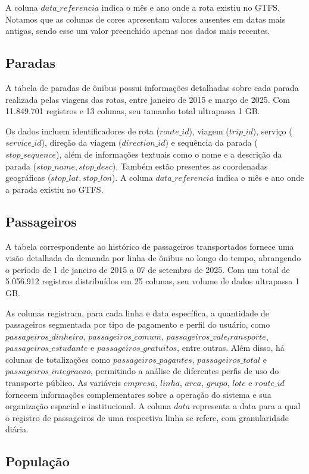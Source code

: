 A coluna $data\_referencia$ indica o mês e ano onde a rota existiu no GTFS. Notamos que as colunas de cores apresentam valores ausentes em datas mais antigas, sendo esse um valor preenchido apenas nos dados mais recentes.

\subsection{Paradas}
A tabela de paradas de ônibus possui informações detalhadas sobre cada parada realizada pelas viagens das rotas, entre janeiro de 2015 e março de 2025. Com 11.849.701 registros e 13 colunas, seu tamanho total ultrapassa 1 GB.

Os dados incluem identificadores de rota ($route\_id$), viagem ($trip\_id$), serviço ($service\_id$), direção da viagem ($direction\_id$) e sequência da parada ($stop\_sequence$), além de informações textuais como o nome e a descrição da parada ($stop\_name, stop\_desc$). Também estão presentes as coordenadas geográficas ($stop\_lat, stop\_lon$). A coluna $data\_referencia$ indica o mês e ano onde a parada existiu no GTFS.

\subsection{Passageiros}

A tabela correspondente ao histórico de passageiros transportados fornece uma visão detalhada da demanda por linha de ônibus ao longo do tempo, abrangendo o período de 1 de janeiro de 2015 a 07 de setembro de 2025. Com um total de 5.056.912 registros distribuídos em 25 colunas, seu volume de dados ultrapassa 1 GB.

As colunas registram, para cada linha e data específica, a quantidade de passageiros segmentada por tipo de pagamento e perfil do usuário, como $passageiros\_dinheiro$, $passageiros\_comum$, $passageiros\_vale_transporte$, $passageiros\_estudante$ e $passageiros\_gratuitos$, entre outras. Além disso, há colunas de totalizações como $passageiros\_pagantes$, $passageiros\_total$ e $passageiros\_integracao$, permitindo a análise de diferentes perfis de uso do transporte público. As variáveis $empresa$, $linha$, $area$, $grupo$, $lote$ e $route\_id$ fornecem informações complementares sobre a operação do sistema e sua organização espacial e institucional. A coluna $data$ representa a data para a qual o registro de passageiros de uma respectiva linha se refere, com granularidade diária.

\subsection{População}

